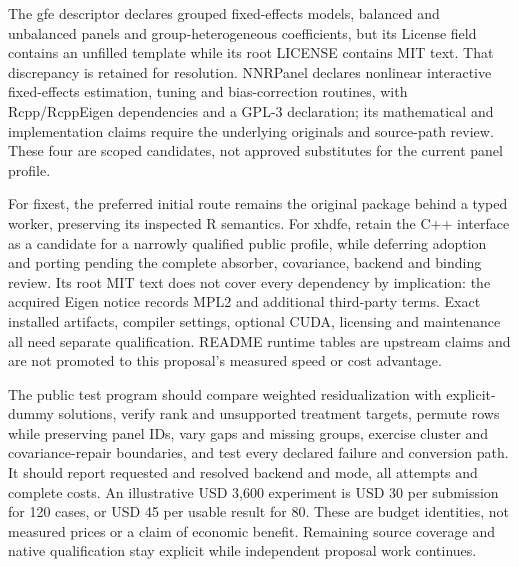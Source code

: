The gfe descriptor declares grouped fixed-effects models, balanced and
unbalanced panels and group-heterogeneous coefficients, but its License field
contains an unfilled template while its root LICENSE contains MIT text.
That discrepancy is retained for resolution. NNRPanel declares nonlinear
interactive fixed-effects estimation, tuning and bias-correction routines,
with Rcpp/RcppEigen dependencies and a GPL-3 declaration; its mathematical
and implementation claims require the underlying originals and source-path
review. These four are scoped candidates, not approved substitutes for the
current panel profile.\citep{exec25_panelcxx_gfe,exec25_panelcxx_nnr}

For fixest, the preferred initial route remains the original package behind
a typed worker, preserving its inspected R semantics. For xhdfe, retain
the C++ interface as a candidate for a narrowly qualified public profile,
while deferring adoption and porting pending the complete absorber,
covariance, backend and binding review. Its root MIT text does not cover
every dependency by implication: the acquired Eigen notice records MPL2
and additional third-party terms. Exact installed artifacts, compiler
settings, optional CUDA, licensing and maintenance all need separate
qualification. README runtime tables are upstream claims and are not
promoted to this proposal's measured speed or cost advantage.
\citep{exec20_fixest_source,exec25_panelcxx_xhdfe,exec25_panelcxx_reference}

The public test program should compare weighted residualization with
explicit-dummy solutions, verify rank and unsupported treatment targets,
permute rows while preserving panel IDs, vary gaps and missing groups,
exercise cluster and covariance-repair boundaries, and test every declared
failure and conversion path. It should report requested and resolved
backend and mode, all attempts and complete costs. An illustrative USD
3,600 experiment is USD 30 per submission for 120 cases, or USD 45 per
usable result for 80. These are budget identities, not measured prices
or a claim of economic benefit. Remaining source coverage and native
qualification stay explicit while independent proposal work continues.
\citep{exec25_panelcxx_reference}
